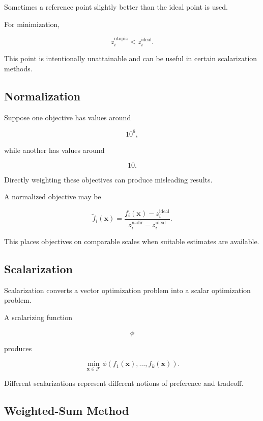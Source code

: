 Sometimes a reference point slightly better than the ideal point is used.

For minimization,

\[
\boxed{
z_i^{\mathrm{utopia}}
<
z_i^{\mathrm{ideal}}.
}
\]

This point is intentionally unattainable and can be useful in certain
scalarization methods.

\subsection{Normalization}
\label{subsec:multiobjective-normalization}

Suppose one objective has values around

\[
10^6,
\]

while another has values around

\[
10.
\]

Directly weighting these objectives can produce misleading results.

A normalized objective may be

\[
\boxed{
\widetilde{f}_i(\mathbf{x})
=
\frac{
f_i(\mathbf{x})
-
z_i^{\mathrm{ideal}}
}{
z_i^{\mathrm{nadir}}
-
z_i^{\mathrm{ideal}}
}.
}
\]

This places objectives on comparable scales when suitable estimates are
available.

\subsection{Scalarization}
\label{subsec:multiobjective-scalarization}

Scalarization converts a vector optimization problem into a scalar
optimization problem.

A scalarizing function

\[
\phi
\]

produces

\[
\boxed{
\min_{\mathbf{x}\in\mathcal{F}}
\phi
(
f_1(\mathbf{x}),
\ldots,
f_k(\mathbf{x})
).
}
\]

Different scalarizations represent different notions of preference and
tradeoff.

\subsection{Weighted-Sum Method}
\label{subsec:weighted-sum-method}

